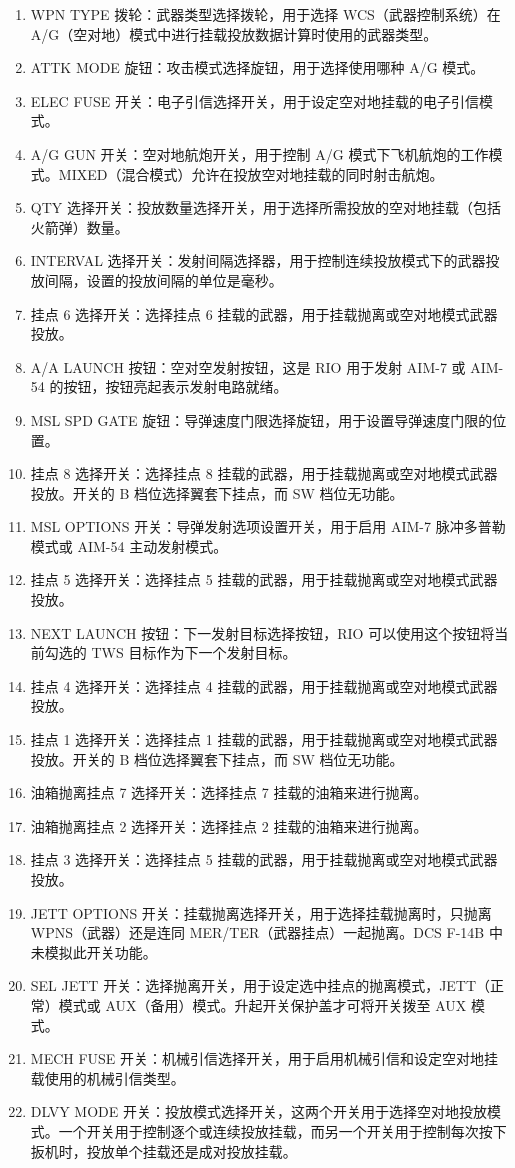 \begin{enumerate}
  \item WPN TYPE 拨轮：武器类型选择拨轮，用于选择 WCS（武器控制系统）在 A/G（空对地）模式中进行挂载投放数据计算时使用的武器类型。
  \item ATTK MODE 旋钮：攻击模式选择旋钮，用于选择使用哪种 A/G 模式。
  \item ELEC FUSE 开关：电子引信选择开关，用于设定空对地挂载的电子引信模式。
  \item A/G GUN 开关：空对地航炮开关，用于控制 A/G 模式下飞机航炮的工作模式。MIXED（混合模式）允许在投放空对地挂载的同时射击航炮。
  \item QTY 选择开关：投放数量选择开关，用于选择所需投放的空对地挂载（包括火箭弹）数量。
  \item INTERVAL 选择开关：发射间隔选择器，用于控制连续投放模式下的武器投放间隔，设置的投放间隔的单位是毫秒。
  \item 挂点 6 选择开关：选择挂点 6 挂载的武器，用于挂载抛离或空对地模式武器投放。
  \item A/A LAUNCH 按钮：空对空发射按钮，这是 RIO 用于发射 AIM-7 或 AIM-54 的按钮，按钮亮起表示发射电路就绪。
  \item MSL SPD GATE 旋钮：导弹速度门限选择旋钮，用于设置导弹速度门限的位置。
  \item 挂点 8 选择开关：选择挂点 8 挂载的武器，用于挂载抛离或空对地模式武器投放。开关的 B 档位选择翼套下挂点，而 SW 档位无功能。
  \item MSL OPTIONS 开关：导弹发射选项设置开关，用于启用 AIM-7 脉冲多普勒模式或 AIM-54 主动发射模式。
  \item 挂点 5 选择开关：选择挂点 5 挂载的武器，用于挂载抛离或空对地模式武器投放。
  \item NEXT LAUNCH 按钮：下一发射目标选择按钮，RIO 可以使用这个按钮将当前勾选的 TWS 目标作为下一个发射目标。
  \item 挂点 4 选择开关：选择挂点 4 挂载的武器，用于挂载抛离或空对地模式武器投放。
  \item 挂点 1 选择开关：选择挂点 1 挂载的武器，用于挂载抛离或空对地模式武器投放。开关的 B 档位选择翼套下挂点，而 SW 档位无功能。
  \item 油箱抛离挂点 7 选择开关：选择挂点 7 挂载的油箱来进行抛离。
  \item 油箱抛离挂点 2 选择开关：选择挂点 2 挂载的油箱来进行抛离。
  \item 挂点 3 选择开关：选择挂点 5 挂载的武器，用于挂载抛离或空对地模式武器投放。
  \item JETT OPTIONS 开关：挂载抛离选择开关，用于选择挂载抛离时，只抛离 WPNS（武器）还是连同 MER/TER（武器挂点）一起抛离。DCS F-14B 中未模拟此开关功能。
  \item SEL JETT 开关：选择抛离开关，用于设定选中挂点的抛离模式，JETT（正常）模式或 AUX（备用）模式。升起开关保护盖才可将开关拨至 AUX 模式。
  \item MECH FUSE 开关：机械引信选择开关，用于启用机械引信和设定空对地挂载使用的机械引信类型。
  \item DLVY MODE 开关：投放模式选择开关，这两个开关用于选择空对地投放模式。一个开关用于控制逐个或连续投放挂载，而另一个开关用于控制每次按下扳机时，投放单个挂载还是成对投放挂载。
\end{enumerate}


